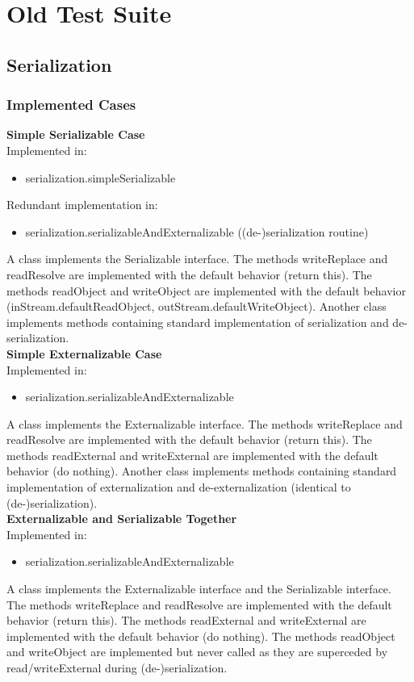 \documentclass{article}
\begin{document}
\section{Old Test Suite}\label{sec:oldtestsuite}
\subsection{Serialization}
\subsubsection{Implemented Cases}

\textbf{Simple Serializable Case}\\
Implemented in: 
\begin{itemize}
    \item serialization.simpleSerializable
\end{itemize}
Redundant implementation in: 
\begin{itemize}
    \item serialization.serializableAndExternalizable ((de-)serialization routine)
\end{itemize}
A class implements the Serializable interface. The methods writeReplace and readResolve are implemented with the default behavior (return this). The methods readObject and writeObject are implemented with the default behavior (inStream.defaultReadObject, outStream.defaultWriteObject). Another class implements methods containing standard implementation of serialization and de-serialization.\\

\noindent
\textbf{Simple Externalizable Case}\\
Implemented in: 
\begin{itemize}
    \item serialization.serializableAndExternalizable
\end{itemize}
A class implements the Externalizable interface. The methods writeReplace and readResolve are implemented with the default behavior (return this). The methods readExternal and writeExternal are implemented with the default behavior (do nothing). Another class implements methods containing standard implementation of externalization and de-externalization (identical to (de-)serialization).\\

\noindent
\textbf{Externalizable and Serializable Together}\\
Implemented in: 
\begin{itemize}
    \item serialization.serializableAndExternalizable
\end{itemize}
A class implements the Externalizable interface and the Serializable interface. The methods writeReplace and readResolve are implemented with the default behavior (return this). The methods readExternal and writeExternal are implemented with the default behavior (do nothing). The methods readObject and writeObject are implemented but never called as they are superceded by read/writeExternal during (de-)serialization.\\
\end{document}
